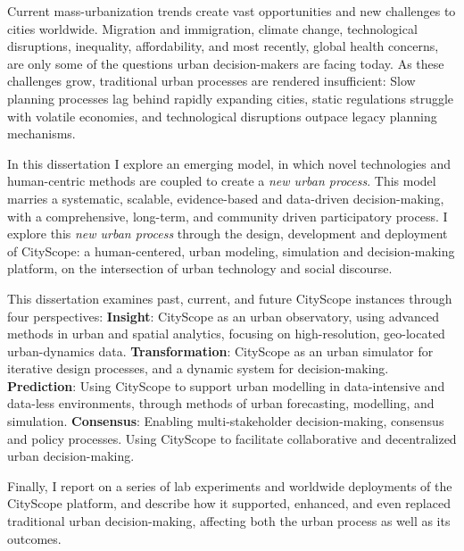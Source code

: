 {Current mass-urbanization trends create vast opportunities and new challenges to cities worldwide. Migration and immigration, climate change, technological disruptions, inequality, affordability, and most recently, global health concerns, are only some of the questions urban decision-makers are facing today. As these challenges grow, traditional urban processes are rendered insufficient: Slow planning processes lag behind rapidly expanding cities, static regulations struggle with volatile economies, and technological disruptions outpace legacy planning mechanisms.}

{In this dissertation I explore an emerging model, in which novel technologies and human-centric methods are coupled to create a \textit{new urban process}. This model marries a systematic, scalable, evidence-based and data-driven decision-making, with a comprehensive, long-term, and community driven participatory process. I explore this \textit{new urban process} through the design, development and deployment of CityScope: a human-centered, urban modeling, simulation and decision-making platform, on the intersection of urban technology and social discourse.}

{This dissertation examines past, current, and future CityScope instances through four perspectives: \textbf{Insight}: CityScope as an urban observatory, using advanced methods in urban and spatial analytics, focusing on high-resolution, geo-located urban-dynamics data.
\textbf{Transformation}: CityScope as an urban simulator for iterative design processes, and a dynamic system for decision-making.
\textbf{Prediction}: Using CityScope to support urban modelling in data-intensive and data-less environments, through methods of urban forecasting, modelling, and simulation.
\textbf{Consensus}: Enabling multi-stakeholder decision-making, consensus and policy processes. Using CityScope to facilitate collaborative and decentralized urban decision-making.} 

{Finally, I report on a series of lab experiments and worldwide deployments of the CityScope platform, and describe how it supported, enhanced, and even replaced traditional urban decision-making, affecting both the urban process as well as its outcomes.}